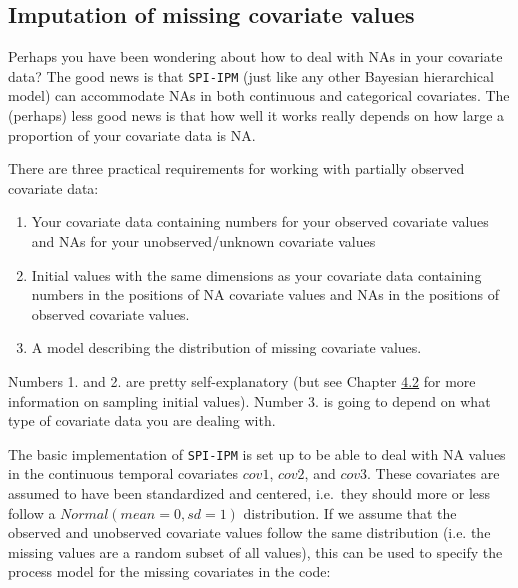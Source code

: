 \documentclass[
]{book}
\begin{document}
\hypertarget{imputation-of-missing-covariate-values}{%
\subsection{Imputation of missing covariate values}\label{imputation-of-missing-covariate-values}}

Perhaps you have been wondering about how to deal with NAs in your covariate
data? The good news is that \texttt{SPI-IPM} (just like any other Bayesian
hierarchical model) can accommodate NAs in both continuous and categorical
covariates. The (perhaps) less good news is that how well it works really
depends on how large a proportion of your covariate data is NA.

There are three practical requirements for working with partially observed
covariate data:

\begin{enumerate}
\def\labelenumi{\arabic{enumi}.}
\item
  Your covariate data containing numbers for your observed covariate values and NAs for your unobserved/unknown covariate values
\item
  Initial values with the same dimensions as your covariate data containing
  numbers in the positions of NA covariate values and NAs in the positions of
  observed covariate values.
\item
  A model describing the distribution of missing covariate values.
\end{enumerate}

Numbers 1. and 2. are pretty self-explanatory (but see Chapter \protect\hyperlink{ux5cux23ux5cux2520Simulationux5cux2520ofux5cux2520initialux5cux2520values}{4.2} for more information on sampling initial values).
Number 3. is going to depend on what type of covariate data you are dealing with.

The basic implementation of \texttt{SPI-IPM} is set up to be able to deal with NA
values in the continuous temporal covariates \(cov1\), \(cov2\), and \(cov3\). These
covariates are assumed to have been standardized and centered, i.e.~they should
more or less follow a \(Normal(mean= 0, sd = 1)\) distribution. If we assume that
the observed and unobserved covariate values follow the same distribution (i.e.
the missing values are a random subset of all values), this can be used to
specify the process model for the missing covariates in the code:
\end{document}
